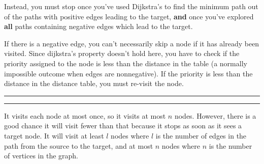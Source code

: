 \documentclass[11pt,letterpaper]{article}
\newcommand{\question}[2] {\vspace{.25in} \hrule\vspace{0.5em}
\noindent{\bf #1: #2} \vspace{0.5em}
\hrule \vspace{.10in}}
\begin{document}
Instead, you must stop once you've used Dijkstra's to find the minimum
path out of the paths with positive edges leading to the target, \textbf{and}
once you've explored \textbf{all} paths containing negative edges which lead to the target.

If there is a negative edge, you can't necessarily skip a node if it has
already been visited. Since dijkstra's property doesn't hold here, you have
to check if the priority assigned to the node is less than the distance
in the table (a normally impossible outcome when edges are nonnegative). If
the priority is less than the distance in the distance table, you must re-visit the node.

\question{5}{Task 2.8}
It visits each node at most once, so it visits at most $n$ nodes.
However, there is a good chance it will visit fewer than that because it
stops as soon as it sees a target node. It will visit at least $l$ nodes
where $l$ is the number of edges in the path from the source to the target,
and at most $n$ nodes where $n$ is the number of vertices in the graph.
\end{document}
